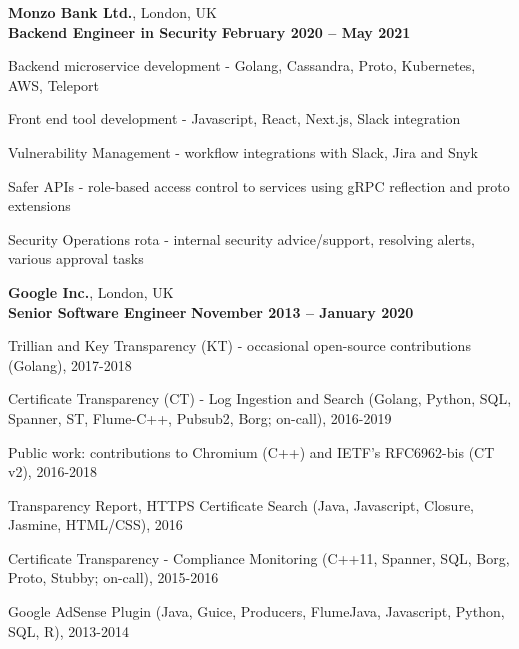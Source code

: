 \documentclass[line]{resume}
\begin{document}
\begin{resume}
    \textbf{Monzo Bank Ltd.}, London, UK \vspace{2mm}\\\vspace{1mm}%
    \textbf{Backend Engineer in Security} \hfill \textbf{February 2020 -- May 2021}\vspace{-3mm}\\\vspace{-1mm}%
    \begin{list2}
        \item Backend microservice development - Golang, Cassandra, Proto, Kubernetes, AWS, Teleport
        \item Front end tool development - Javascript, React, Next.js, Slack integration
        \item Vulnerability Management - workflow integrations with Slack, Jira and Snyk
        \item Safer APIs - role-based access control to services using gRPC reflection and proto extensions
        \item Security Operations rota - internal security advice/support, resolving alerts, various approval tasks
    \end{list2}\vspace{-1.5mm}

    \textbf{Google Inc.}, London, UK \vspace{2mm}\\\vspace{1mm}%
    \textbf{Senior Software Engineer} \hfill \textbf{November 2013 -- January 2020}\vspace{-3mm}\\\vspace{-1mm}%
    \begin{list2}
        \item Trillian and Key Transparency (KT) - occasional open-source contributions (Golang), 2017-2018
        \item Certificate Transparency (CT) - Log Ingestion and Search (Golang, Python, SQL, Spanner, ST, Flume-C++, Pubsub2, Borg; on-call), 2016-2019
        \item Public work: contributions to Chromium (C++) and IETF's RFC6962-bis (CT v2), 2016-2018
        \item Transparency Report, HTTPS Certificate Search (Java, Javascript, Closure, Jasmine, HTML/CSS), 2016
        \item Certificate Transparency - Compliance Monitoring (C++11, Spanner, SQL, Borg, Proto, Stubby; on-call), 2015-2016
        \item Google AdSense Plugin (Java, Guice, Producers, FlumeJava, Javascript, Python, SQL, R), 2013-2014
    \end{list2}\vspace{-1.5mm}


\end{resume}
\end{document}
